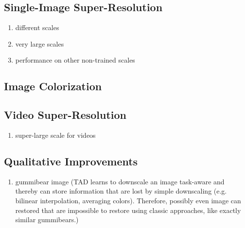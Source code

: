 \subsection{Single-Image Super-Resolution}
\label{sec:Experiments_SISR}

\begin{enumerate}
\item different scales
\item very large scales
\item performance on other non-trained scales
\end{enumerate}

\subsection{Image Colorization}
\label{sec:Experiments_IC}

\subsection{Video Super-Resolution}
\label{sec:Experiments_VSR}

\begin{enumerate}
\item super-large scale for videos
\end{enumerate}

\subsection{Qualitative Improvements}
\label{sec:Experiments_QI}

\begin{enumerate}
\item gummibear image (TAD learns to downscale an image task-aware and thereby
can store information that are lost by simple downscaling (e.g. bilinear
interpolation, averaging colors). Therefore, possibly even image can restored
that are impossible to restore  using classic approaches, like exactly
similar gummibears.)
\end{enumerate}

